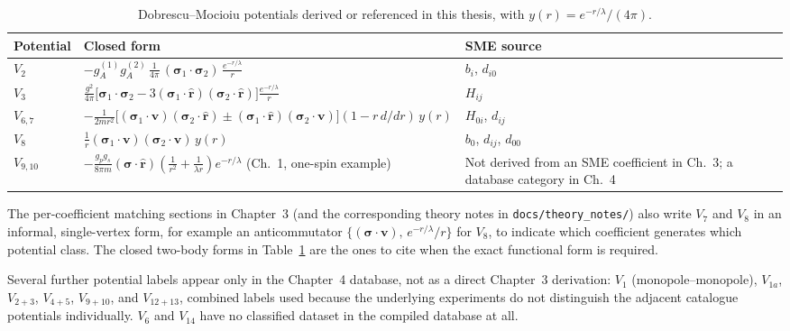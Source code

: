\documentclass[main]{subfiles}
\begin{document}
\begin{table}[h]
\centering
\small
\begin{tabular}{@{}l>{\raggedright\arraybackslash}p{7.5cm}l@{}}
\toprule
Potential & Closed form & SME source \\
\midrule
$V_2$ & $-g_A^{(1)}g_A^{(2)}\,\tfrac{1}{4\pi}\,(\boldsymbol\sigma_1\cdot\boldsymbol\sigma_2)\,\tfrac{e^{-r/\lambda}}{r}$ & $b_i$, $d_{i0}$ \\
$V_3$ & $\tfrac{g^2}{4\pi}\big[\boldsymbol\sigma_1\cdot\boldsymbol\sigma_2-3(\boldsymbol\sigma_1\cdot\hat{\mathbf r})(\boldsymbol\sigma_2\cdot\hat{\mathbf r})\big]\tfrac{e^{-r/\lambda}}{r}$ & $H_{ij}$ \\
$V_{6,7}$ & $-\tfrac{1}{2mr^2}\big[(\boldsymbol\sigma_1\cdot\mathbf v)(\boldsymbol\sigma_2\cdot\hat{\mathbf r})\pm(\boldsymbol\sigma_1\cdot\hat{\mathbf r})(\boldsymbol\sigma_2\cdot\mathbf v)\big](1-r\,d/dr)\,y(r)$ & $H_{0i}$, $d_{ij}$ \\
$V_8$ & $\tfrac1r(\boldsymbol\sigma_1\cdot\mathbf v)(\boldsymbol\sigma_2\cdot\mathbf v)\,y(r)$ & $b_0$, $d_{ij}$, $d_{00}$ \\
$V_{9,10}$ & $-\tfrac{g_pg_s}{8\pi m}(\boldsymbol\sigma\cdot\hat{\mathbf r})\left(\tfrac1{r^2}+\tfrac1{\lambda r}\right)e^{-r/\lambda}$ (Ch.~1, one-spin example) & Not derived from an SME coefficient in Ch.~3; a database category in Ch.~4 \\
\bottomrule
\end{tabular}
\caption{Dobrescu--Mocioiu potentials derived or referenced in this thesis, with $y(r)=e^{-r/\lambda}/(4\pi)$.}
\label{tab:app-dm-potentials}
\end{table}

The per-coefficient matching sections in Chapter~3 (and the corresponding
theory notes in \texttt{docs/theory\_notes/}) also write $V_7$ and $V_8$ in
an informal, single-vertex form, for example an anticommutator
$\{(\boldsymbol\sigma\cdot\mathbf v),\,e^{-r/\lambda}/r\}$ for $V_8$, to
indicate which coefficient generates which potential class. The closed
two-body forms in Table~\ref{tab:app-dm-potentials} are the ones to cite
when the exact functional form is required.

Several further potential labels appear only in the Chapter~4 database, not
as a direct Chapter~3 derivation: $V_1$ (monopole--monopole), $V_{1a}$,
$V_{2+3}$, $V_{4+5}$, $V_{9+10}$, and $V_{12+13}$, combined labels used
because the underlying experiments do not distinguish the adjacent
catalogue potentials individually. $V_6$ and $V_{14}$ have no classified
dataset in the compiled database at all.
\end{document}
